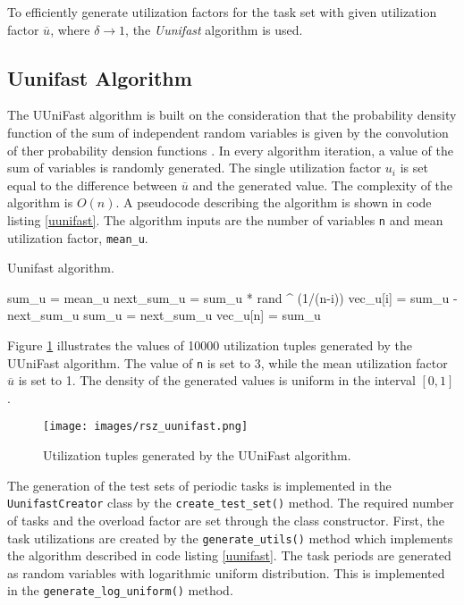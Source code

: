 To efficiently generate utilization factors for the task set with given utilization factor $\overline{u}$, where $\delta \rightarrow 1$, the \textit{Uunifast} algorithm is used.

\subsection{Uunifast Algorithm}
The UUniFast algorithm is built on the consideration that the probability density function of the sum of independent random variables is given by the convolution of ther probability dension functions \cite{bini2005measuring}.
In every algorithm iteration, a value of the sum of variables is randomly generated.
The single utilization factor $u_i$ is set equal to the difference between $\overline{u}$ and the generated value.
The complexity of the algorithm is $O(n)$.
A pseudocode describing the algorithm is shown in code listing \ref{uunifast}.
The algorithm inputs are the number of variables \texttt{n} and mean utilization factor, \texttt{mean\_u}.
\begin{algorithm}
\caption{Uunifast algorithm.\label{uunifast}}
\begin{algorithmic}
\STATE sum\_u = mean\_u
\STATE next\_sum\_u = sum\_u * rand \^{} (1/(n-i))
\STATE vec\_u[i] = sum\_u - next\_sum\_u
\STATE sum\_u = next\_sum\_u
\ENDFOR
\STATE vec\_u[n] = sum\_u
\end{algorithmic}
\end{algorithm}
Figure \ref{uunifast:fig} illustrates the values of 10000 utilization tuples generated by the UUniFast algorithm.
The value of \texttt{n} is set to 3, while the mean utilization factor $\overline{u}$ is set to 1.
The density of the generated values is uniform in the interval $[0, 1]$.
\begin{figure}[ht]
    \centering
    \texttt{[image: images/rsz\_uunifast.png]}
    \caption{Utilization tuples generated by the UUniFast algorithm.}
    \label{uunifast:fig}
\end{figure}

The generation of the test sets of periodic tasks is implemented in the \texttt{UunifastCreator} class by the \texttt{create\_test\_set()} method.
The required number of tasks and the overload factor are set through the class constructor.
First, the task utilizations are created by the \texttt{generate\_utils()} method which implements the algorithm described in code listing \ref{uunifast}.
The task periods are generated as random variables with logarithmic uniform distribution.
This is implemented in the \texttt{generate\_log\_uniform()} method.

